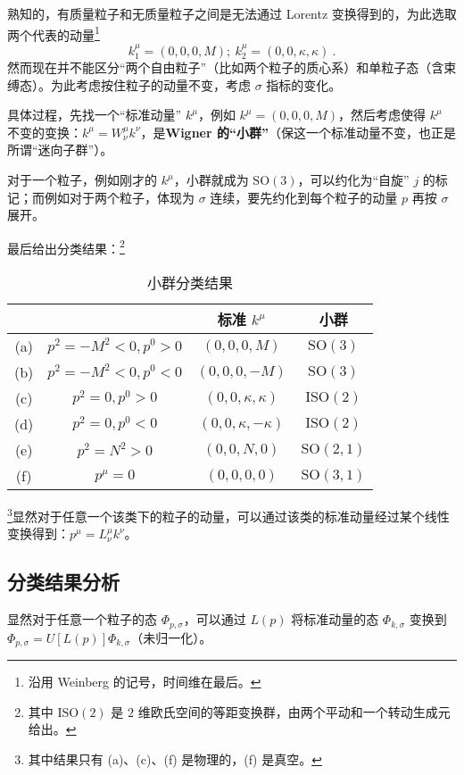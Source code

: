 熟知的，有质量粒子和无质量粒子之间是无法通过 Lorentz 变换得到的，为此选取两个代表的动量\footnote{沿用 Weinberg 的记号，时间维在最后。}
\begin{equation}
	k_1^\mu = (0, 0, 0, M); ~ k_2^\mu = (0, 0, \kappa, \kappa) ~.
\end{equation}
然而现在并不能区分“两个自由粒子”（比如两个粒子的质心系）和单粒子态（含束缚态）。为此考虑按住粒子的动量不变，考虑 $\sigma$ 指标的变化。

具体过程，先找一个“标准动量” $k^\mu$，例如 $k^\mu = (0, 0, 0, M)$，然后考虑使得 $k^\mu$ 不变的变换：$k^\mu = W^\mu_\nu k^\nu$，是\textbf{\textbf{Wigner 的“小群”}}（保这一个标准动量不变，也正是所谓“迷向子群”）。

对于一个粒子，例如刚才的 $k^\mu$，小群就成为 $\text{SO}(3)$，可以约化为“自旋” $j$ 的标记；而例如对于两个粒子，体现为 $\sigma$ 连续，要先约化到每个粒子的动量 $p$ 再按 $\sigma$ 展开。

最后给出分类结果：\footnote{其中 $\text{ISO}(2)$ 是 $2$ 维欧氏空间的等距变换群，由两个平动和一个转动生成元给出。}
\begin{table}[ht]
\centering
\caption{小群分类结果}\label{tab_WigCla1}
\begin{tabular}{|c|c|c|c|}
\hline
     &  & 标准 $k^\mu$ & 小群 \\
    \hline
    (a) & $p^2 = -M^2 < 0, p^0 > 0$ & $(0, 0, 0, M)$ & $\text{SO}(3)$ \\
    \hline
    (b) & $p^2 = -M^2 < 0, p^0 < 0$ & $(0, 0, 0, -M)$ & $\text{SO}(3)$ \\
    \hline
    (c) & $p^2 = 0, p^0>0$ & $(0, 0, \kappa, \kappa)$ & $\text{ISO}(2)$ \\
    \hline
    (d) & $p^2 = 0, p^0<0$ & $(0, 0, \kappa, -\kappa)$ & $\text{ISO}(2)$ \\ 
    \hline
    (e) & $p^2 = N^2 > 0$ & $(0, 0, N, 0)$ & $\text{SO}(2, 1)$ \\
    \hline
    (f) & $p^\mu = 0$ & $(0, 0, 0, 0)$ & $\text{SO}(3, 1)$ \\
    \hline
\end{tabular}
\end{table}

\footnote{其中结果只有 (a)、(c)、(f) 是物理的，(f) 是真空。}显然对于任意一个该类下的粒子的动量，可以通过该类的标准动量经过某个线性变换得到：$p^\mu = L^\mu_\nu k^\nu$。

\subsection{分类结果分析}
显然对于任意一个粒子的态 $\Phi_{p, \sigma}$，可以通过 $L(p)$ 将标准动量的态 $\Phi_{k, \sigma}$ 变换到 $\Phi_{p, \sigma} = U[L(p)] \Phi_{k,\sigma}$（未归一化）。

